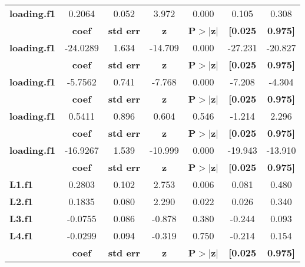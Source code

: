 \documentclass{report}
\begin{document}
\begin{center}
\begin{tabular}{lcccccc}
\midrule
\textbf{loading.f1} &       0.2064  &        0.052     &     3.972  &         0.000        &        0.105    &        0.308     \\
                    & \textbf{coef} & \textbf{std err} & \textbf{z} & \textbf{P$>$$|$z$|$} & \textbf{[0.025} & \textbf{0.975]}  \\
\midrule
\textbf{loading.f1} &     -24.0289  &        1.634     &   -14.709  &         0.000        &      -27.231    &      -20.827     \\
                    & \textbf{coef} & \textbf{std err} & \textbf{z} & \textbf{P$>$$|$z$|$} & \textbf{[0.025} & \textbf{0.975]}  \\
\midrule
\textbf{loading.f1} &      -5.7562  &        0.741     &    -7.768  &         0.000        &       -7.208    &       -4.304     \\
                    & \textbf{coef} & \textbf{std err} & \textbf{z} & \textbf{P$>$$|$z$|$} & \textbf{[0.025} & \textbf{0.975]}  \\
\midrule
\textbf{loading.f1} &       0.5411  &        0.896     &     0.604  &         0.546        &       -1.214    &        2.296     \\
                    & \textbf{coef} & \textbf{std err} & \textbf{z} & \textbf{P$>$$|$z$|$} & \textbf{[0.025} & \textbf{0.975]}  \\
\midrule
\textbf{loading.f1} &     -16.9267  &        1.539     &   -10.999  &         0.000        &      -19.943    &      -13.910     \\
               & \textbf{coef} & \textbf{std err} & \textbf{z} & \textbf{P$>$$|$z$|$} & \textbf{[0.025} & \textbf{0.975]}  \\
\midrule
\textbf{L1.f1} &       0.2803  &        0.102     &     2.753  &         0.006        &        0.081    &        0.480     \\
\textbf{L2.f1} &       0.1835  &        0.080     &     2.290  &         0.022        &        0.026    &        0.340     \\
\textbf{L3.f1} &      -0.0755  &        0.086     &    -0.878  &         0.380        &       -0.244    &        0.093     \\
\textbf{L4.f1} &      -0.0299  &        0.094     &    -0.319  &         0.750        &       -0.214    &        0.154     \\
                           & \textbf{coef} & \textbf{std err} & \textbf{z} & \textbf{P$>$$|$z$|$} & \textbf{[0.025} & \textbf{0.975]}  \\

\end{tabular}
\end{center}
\end{document}
